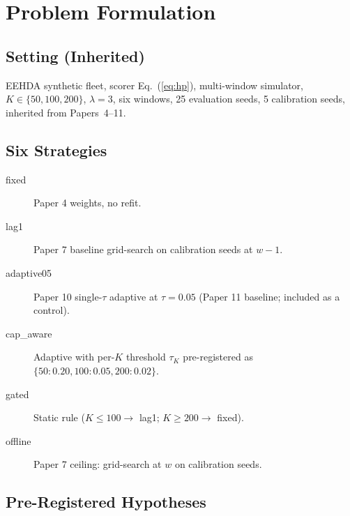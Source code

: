 \section{Problem Formulation}
\label{sec:problem}

\subsection{Setting (Inherited)}

EEHDA synthetic fleet, scorer Eq.~(\ref{eq:hp}), multi-window
simulator, $K \in \{50, 100, 200\}$, $\lambda = 3$, six windows,
25 evaluation seeds, 5 calibration seeds, inherited from
Papers~4--11.

\subsection{Six Strategies}

\begin{description}
\item[\textsf{fixed}] Paper 4 weights, no refit.
\item[\textsf{lag1}] Paper 7 baseline grid-search on calibration
seeds at $w - 1$.
\item[\textsf{adaptive05}] Paper 10 single-$\tau$ adaptive at
$\tau = 0.05$ (Paper 11 baseline; included as a control).
\item[\textsf{cap\_aware}] Adaptive with per-$K$ threshold
$\tau_K$ pre-registered as $\{50: 0.20, 100: 0.05, 200: 0.02\}$.
\item[\textsf{gated}] Static rule ($K \leq 100 \to$ lag1; $K \geq
200 \to$ fixed).
\item[\textsf{offline}] Paper 7 ceiling: grid-search at $w$ on
calibration seeds.
\end{description}

\subsection{Pre-Registered Hypotheses}

